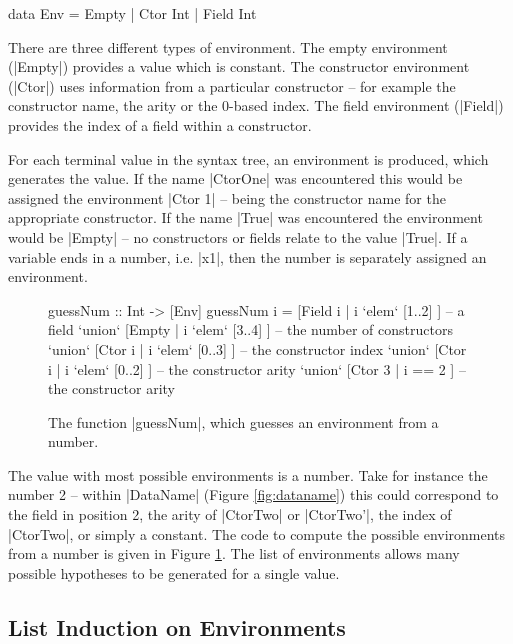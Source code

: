 \documentclass{llncs}
\begin{document}
\begin{code}
data Env = Empty | Ctor Int | Field Int
\end{code}

There are three different types of environment. The empty environment (|Empty|) provides a value which is constant. The constructor environment (|Ctor|) uses information from a particular constructor -- for example the constructor name, the arity or the 0-based index. The field environment (|Field|) provides the index of a field within a constructor.

For each terminal value in the syntax tree, an environment is produced, which generates the value. If the name |CtorOne| was encountered this would be assigned the environment |Ctor 1| -- being the constructor name for the appropriate constructor. If the name |True| was encountered the environment would be |Empty| -- no constructors or fields relate to the value |True|. If a variable ends in a number, i.e. |x1|, then the number is separately assigned an environment.

\begin{figure}[t]
\begin{code}
guessNum :: Int -> [Env]
guessNum i  =        [Field i  | i `elem` [1..2]  ]  -- a field
            `union`  [Empty    | i `elem` [3..4]  ]  -- the number of constructors
            `union`  [Ctor i   | i `elem` [0..3]  ]  -- the constructor index
            `union`  [Ctor i   | i `elem` [0..2]  ]  -- the constructor arity
            `union`  [Ctor 3   | i == 2           ]  -- the constructor arity
\end{code}
\caption{The function |guessNum|, which guesses an environment from a number.}
\label{fig:guessnum}
\end{figure}

The value with most possible environments is a number. Take for instance the number 2 -- within |DataName| (Figure \ref{fig:dataname}) this could correspond to the field in position 2, the arity of |CtorTwo| or |CtorTwo'|, the index of |CtorTwo|, or simply a constant. The code to compute the possible environments from a number is given in Figure \ref{fig:guessnum}. The list of environments allows many possible hypotheses to be generated for a single value.


\subsection{List Induction on Environments}
\label{sec:induction}
\end{document}
